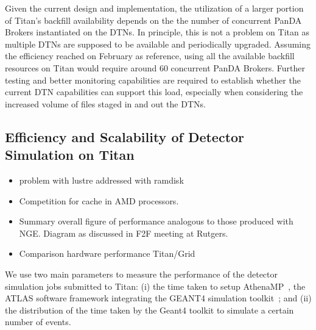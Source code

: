 Given the current design and implementation, the utilization of a larger portion
of Titan's backfill availability depends on the the number of concurrent PanDA
Brokers instantiated on the DTNs.
In principle, this is not a problem on Titan as multiple DTNs are supposed to be
available and periodically upgraded. Assuming the efficiency reached on February
as reference, using all the available backfill resources on Titan would require
around 60 concurrent PanDA Brokers. Further testing and better monitoring
capabilities are required to establish whether the current DTN capabilities can
support this load, especially when considering the increased volume of files
staged in and out the DTNs.


\subsection{Efficiency and Scalability of Detector Simulation on Titan}
\label{ssec:panda_titan}

\begin{itemize}
    \item problem with lustre addressed with ramdisk
    \item Competition for cache in AMD processors.
    \item Summary overall figure of performance analogous to those produced with NGE. Diagram as discussed in F2F meeting at Rutgers.
    \item Comparison hardware performance Titan/Grid
\end{itemize}

We use two main parameters to measure the performance of the detector simulation
jobs submitted to Titan: (i) the time taken to setup
AthenaMP~\cite{aad2010atlas}, the ATLAS software framework integrating the
GEANT4 simulation toolkit~\cite{agostinelli2003geant4}; and (ii) the
distribution of the time taken by the Geant4 toolkit to simulate a certain
number of events.


